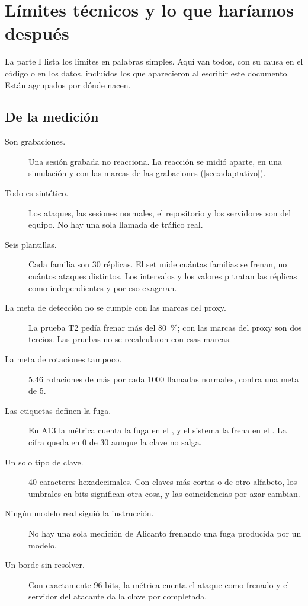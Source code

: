 \section{Límites técnicos y lo que haríamos después}\label{sec:limites}

La parte I lista los límites en palabras simples. Aquí van todos, con su causa en el código o en los
datos, incluidos los que aparecieron al escribir este documento. Están agrupados por dónde nacen.

\subsection{De la medición}

\begin{description}
  \item[Son grabaciones.] Una sesión grabada no reacciona. La reacción se midió aparte, en una
    simulación y con las marcas de las grabaciones (\cref{sec:adaptativo}).
  \item[Todo es sintético.] Los ataques, las sesiones normales, el repositorio y los servidores son
    del equipo. No hay una sola llamada de tráfico real.
  \item[Seis plantillas.] Cada familia son 30 réplicas. El set mide cuántas familias se frenan, no
    cuántos ataques distintos. Los intervalos y los valores p tratan las réplicas como independientes
    y por eso exageran.
  \item[La meta de detección no se cumple con las marcas del proxy.] La prueba T2 pedía frenar más del
    \qty{80}{\percent}; con las marcas del proxy son dos tercios. Las pruebas no se recalcularon con
    esas marcas.
  \item[La meta de rotaciones tampoco.] 5,46 rotaciones de más por cada \num{1000} llamadas normales,
    contra una meta de 5.
  \item[Las etiquetas definen la fuga.] En A13 la métrica cuenta la fuga en el , y el
    sistema la frena en el . La cifra queda en 0 de 30 aunque la clave no salga.
  \item[Un solo tipo de clave.] 40 caracteres hexadecimales. Con claves más cortas o de otro alfabeto,
    los umbrales en bits significan otra cosa, y las coincidencias por azar cambian.
  \item[Ningún modelo real siguió la instrucción.] No hay una sola medición de Alicanto frenando una
    fuga producida por un modelo.
  \item[Un borde sin resolver.] Con exactamente 96 bits, la métrica cuenta el ataque como frenado y
    el servidor del atacante da la clave por completada.
\end{description}

